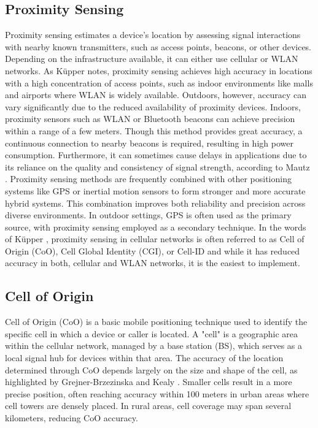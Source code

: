 \subsection{Proximity Sensing}
Proximity sensing estimates a device's location by assessing signal interactions with nearby known transmitters, such as access points, beacons, or other devices. Depending on the infrastructure available, it can either use cellular or WLAN networks. As K\"upper \cite{kupper2005location} notes, proximity sensing achieves high accuracy in locations with a high concentration of access points, such as indoor environments like malls and airports where WLAN is widely available.
Outdoors, however, accuracy can vary significantly due to the reduced availability of proximity devices. Indoors, proximity sensors such as WLAN or Bluetooth beacons can achieve precision within a range of a few meters. Though this method provides great accuracy, a continuous connection to nearby beacons is required, resulting in high power consumption. Furthermore, it can sometimes cause delays in applications due to its reliance on the quality and consistency of signal strength, according to Mautz \cite{mautz2012indoor}.
Proximity sensing methods are frequently combined with other positioning systems like GPS or inertial motion sensors to form stronger and more accurate hybrid systems. This combination improves both reliability and precision across diverse environments. In outdoor settings, GPS is often used as the primary source, with proximity sensing employed as a secondary technique. In the words of K\"upper \cite{kupper2005location}, proximity sensing in cellular networks is often referred to as Cell of Origin (CoO), Cell Global Identity (CGI), or Cell-ID and while it has reduced accuracy in both, cellular and WLAN networks, it is the easiest to implement.

\subsection{Cell of Origin}
Cell of Origin (CoO) is a basic mobile positioning technique used to identify the specific cell in which a device or caller is located. A "cell" is a geographic area within the cellular network, managed by a base station (BS), which serves as a local signal hub for devices within that area. The accuracy of the location determined through CoO depends largely on the size and shape of the cell, as highlighted by Grejner-Brzezinska and Kealy \cite{grejner2004positioning}. Smaller cells result in a more precise position, often reaching accuracy within 100 meters in urban areas where cell towers are densely placed. In rural areas, cell coverage may span several kilometers, reducing CoO accuracy.

